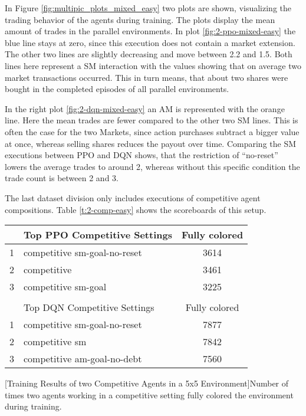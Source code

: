 In Figure \ref{fig:multipic_plots_mixed_easy} two plots are shown, visualizing the trading behavior of the agents during training. The plots display the mean amount of trades in the parallel environments. In plot \ref{fig:2-ppo-mixed-easy} the blue line stays at zero, since this execution does not contain a market extension. The other two lines are slightly decreasing and move between 2.2 and 1.5. Both lines here represent a SM interaction with the values showing that on average two market transactions occurred. This in turn means, that about two shares were bought in the completed episodes of all parallel environments.

In the right plot \ref{fig:2-dqn-mixed-easy} an AM is represented with the orange line. Here the mean trades are fewer compared to the other two SM lines. This is often the case for the two Markets, since action purchases subtract a bigger value at once, whereas selling shares reduces the payout over time. Comparing the SM executions between PPO and DQN shows, that the restriction of ``no-reset'' lowers the average trades to around 2, whereas without this specific condition the trade count is between 2 and 3.

The last dataset division only includes executions of competitive agent compositions. Table \ref{t:2-comp-easy} shows the scoreboards of this setup.

\begin{center}
    \begin{tabular}{clc}\hline
         & Top PPO Competitive Settings & Fully colored \\ \hline
        {\small 1} & competitive sm-goal-no-reset & 3614 \\
        {\small 2} & competitive & 3461 \\
        {\small 3} & competitive sm-goal & 3225 \\ \hline
         &   \\ \hline
         & Top DQN Competitive Settings & Fully colored \\ \hline
        {\small 1} & competitive sm-goal-no-reset & 7877 \\
        {\small 2} & competitive sm & 7842 \\
        {\small 3} & competitive am-goal-no-debt & 7560 \\ \hline
        \end{tabular}
        [Training Results of two Competitive Agents in a 5x5 Environment]{Number of times two agents working in a competitive setting fully colored the environment during training.}\label{t:2-comp-easy}
    \end{center}

